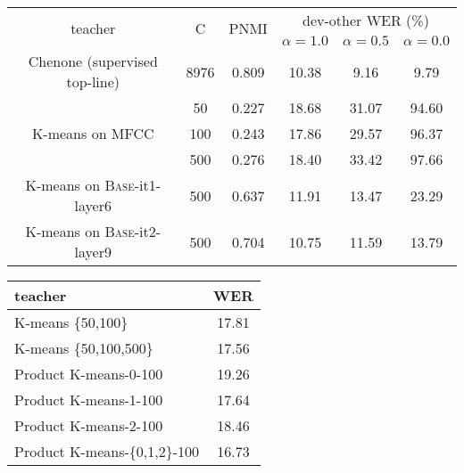 \begin{table*}[t]
    \begin{minipage}[c]{0.68\textwidth}
        \centering
        \begin{tabular}{cc|c|ccc}
    \toprule
    \multirow{2}{*}{teacher} & \multirow{2}{*}{C} & 
    \multirow{2}{*}{PNMI} &
    \multicolumn{3}{c}{dev-other WER (\%)} \\
    & & & $\alpha = 1.0$ & $\alpha = 0.5$ & $\alpha = 0.0$ \\
    \midrule\midrule
    Chenone (supervised top-line)  & 8976 & 0.809 & 10.38 & 9.16 & 9.79 \\
    \midrule
    \multirow{3}{*}{K-means on MFCC} 
    & 50  & 0.227 & 18.68 & 31.07 & 94.60 \\
    & 100 & 0.243 & 17.86 & 29.57 & 96.37 \\
    & 500 & 0.276 & 18.40 & 33.42 & 97.66 \\
    \midrule
    K-means on \textsc{Base}-it1-layer6 & 500 & 0.637 & 11.91 & 13.47 & 23.29 \\
    K-means on \textsc{Base}-it2-layer9 & 500 & 0.704 & 10.75 & 11.59 & 13.79 \\
    \bottomrule
\end{tabular}         \caption{The effect of the training objective and clustering quality on performance. $C$ refers to the number of units, and $\alpha$ is the weight for masked frames.}
        \label{tab:loss}
    \end{minipage}
    \hspace{.5cm}
    \begin{minipage}[c]{0.28\textwidth}
        \centering
        \begin{tabular}{lc}
    \toprule
    teacher & WER \\
    \midrule\midrule
    K-means \{50,100\}       & 17.81 \\
    K-means \{50,100,500\}   & 17.56 \\
    \midrule
    Product K-means-0-100 & 19.26 \\
    Product K-means-1-100 & 17.64 \\
    Product K-means-2-100 & 18.46 \\
    Product K-means-\{0,1,2\}-100 & 16.73 \\
    \bottomrule
\end{tabular}%
         \caption{Cluster ensembles with k-means and product k-means.}
        \label{tab:ens}
    \end{minipage}
\end{table*}

